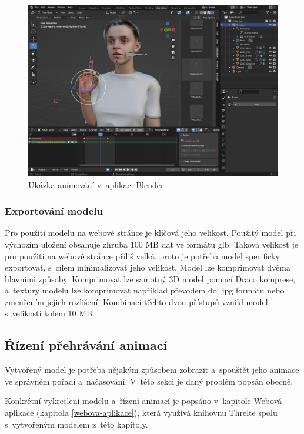 \documentclass[
  master,
  program=ainfvs,
  biblatex,
  figures=true,
  tables=false,
  sourcecodes=true,
  glossaries,
  index
]{kidiplom}
\begin{document}
             \begin{figure}[htbp]
                \centering
                \includegraphics[width=1\columnwidth]{graphics/blender.png}
                \caption{Ukázka animování v~aplikaci Blender}
                \label{blender}
            \end{figure}
                
            \subsubsection{Exportování modelu}
                Pro použití modelu na webové stránce je klíčová jeho velikost. Použitý model při výchozím uložení obsahuje zhruba 100 MB dat ve formátu glb. Taková velikost je pro použití na webové stránce příliš velká, proto je potřeba model specificky exportovat, s~cílem minimalizovat jeho velikost. Model lze komprimovat dvěma hlavními způsoby. Komprimovat lze samotný 3D model pomocí Draco komprese, a~textury modelu lze komprimovat například převodem do .jpg formátu nebo zmenšením jejich rozlišení. Kombinací těchto dvou přístupů vznikl model s~velikostí kolem 10 MB.
    
    
    \subsection{Řízení přehrávání animací}
        Vytvořený model je potřeba nějakým způsobem zobrazit a~spouštět jeho animace ve správném pořadí a~načasování. V~této sekci je daný problém popsán obecně.

        Konkrétní vykreslení modelu a~řízení animací je popsáno v~kapitole Webová aplikace (kapitola \ref{webova-aplikace}), která využívá knihovnu Threlte spolu s~vytvořeným modelem z~této kapitoly.
\end{document}
